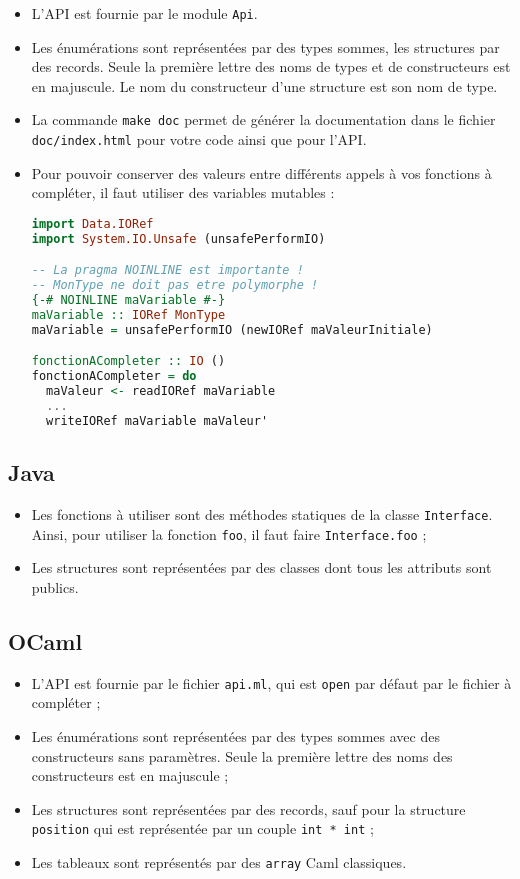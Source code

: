 \begin{itemize}
\item{L'API est fournie par le module \texttt{Api}.}
\item{Les énumérations sont représentées par des types sommes, les structures
      par des records. Seule la première lettre des noms de types et de
      constructeurs est en majuscule. Le nom du constructeur d'une structure
      est son nom de type.}
\item{La commande \texttt{make doc} permet de générer la documentation dans le
      fichier \texttt{doc/index.html} pour votre code ainsi que pour l'API.}
\item{Pour pouvoir conserver des valeurs entre différents appels à vos fonctions
      à compléter, il faut utiliser des variables mutables :}
\begin{lstlisting}[language=Haskell]
import Data.IORef
import System.IO.Unsafe (unsafePerformIO)

-- La pragma NOINLINE est importante !
-- MonType ne doit pas etre polymorphe !
{-# NOINLINE maVariable #-}
maVariable :: IORef MonType
maVariable = unsafePerformIO (newIORef maValeurInitiale)

fonctionACompleter :: IO ()
fonctionACompleter = do
  maValeur <- readIORef maVariable
  ...
  writeIORef maVariable maValeur'

\end{lstlisting}
\end{itemize}

\subsection{Java}

\begin{itemize}
\item{Les fonctions à utiliser sont des méthodes statiques de la classe
      \texttt{Interface}. Ainsi, pour utiliser la fonction \texttt{foo}, il
      faut faire \texttt{Interface.foo} ;}
\item{Les structures sont représentées par des classes dont tous les attributs
      sont publics.}
\end{itemize}

\subsection{OCaml}

\begin{itemize}
\item{L'API est fournie par le fichier \texttt{api.ml}, qui est \texttt{open}
      par défaut par le fichier à compléter ;}
\item{Les énumérations sont représentées par des types sommes avec des
      constructeurs sans paramètres. Seule la première lettre des noms des
      constructeurs est en majuscule ;}
\item{Les structures sont représentées par des records, sauf pour la structure
      \texttt{position} qui est représentée par un couple \texttt{int * int} ;}
\item{Les tableaux sont représentés par des \texttt{array} Caml classiques.}
\end{itemize}

